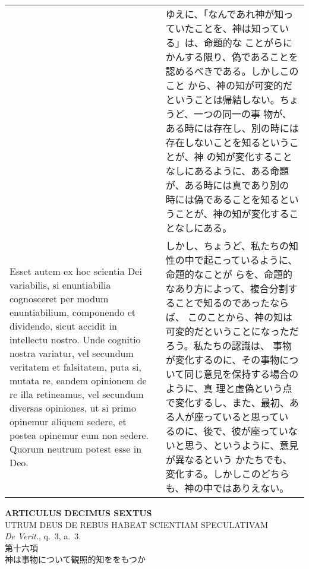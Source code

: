 \documentclass[10pt]{jsarticle} %
\begin{document}
\begin{longtable}{p{21em}p{21em}}
&

ゆえに、「なんであれ神が知っていたことを、神は知っている」は、命題的な
ことがらにかんする限り、偽であることを認めるべきである。しかしこのこと
から、神の知が可変的だということは帰結しない。ちょうど、一つの同一の事
物が、ある時には存在し、別の時には存在しないことを知るということが、神
の知が変化することなしにあるように、ある命題が、ある時には真であり別の
時には偽であることを知るということが、神の知が変化することなしにある。

\\


Esset autem ex hoc scientia Dei variabilis, si enuntiabilia
cognosceret per modum enuntiabilium, componendo et dividendo, sicut
accidit in intellectu nostro. Unde cognitio nostra variatur, vel
secundum veritatem et falsitatem, puta si, mutata re, eandem opinionem
de re illa retineamus, vel secundum diversas opiniones, ut si primo
opinemur aliquem sedere, et postea opinemur eum non sedere. Quorum
neutrum potest esse in Deo.

&

しかし、ちょうど、私たちの知性の中で起こっているように、命題的なことが
らを、命題的なあり方によって、複合分割することで知るのであったならば、
このことから、神の知は可変的だということになっただろう。私たちの認識は、
事物が変化するのに、その事物について同じ意見を保持する場合のように、真
理と虚偽という点で変化するし、また、最初、ある人が座っていると思ってい
るのに、後で、彼が座っていないと思う、というように、意見が異なるという
かたちでも、変化する。しかしこのどちらも、神の中ではありえない。


\end{longtable}
\newpage




\begin{center}
{\Large {\bf ARTICULUS DECIMUS SEXTUS}}\\ {\large UTRUM DEUS DE REBUS
HABEAT SCIENTIAM SPECULATIVAM}\\ {\footnotesize {\itshape De Verit.},
q.~3, a.~3.}\\ {\Large 第十六項\\神は事物について観照的知ををもつか}
\end{center}
\end{document}
